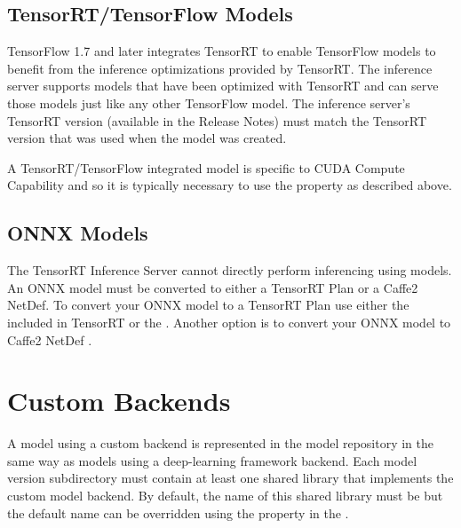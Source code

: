 \documentclass[letterpaper,10pt,english]{sphinxmanual}
\begin{document}
\subsection{TensorRT/TensorFlow Models}
\label{\detokenize{model_repository:tensorrt-tensorflow-models}}
TensorFlow 1.7 and later integrates TensorRT to enable TensorFlow
models to benefit from the inference optimizations provided by
TensorRT. The inference server supports models that have been
optimized with TensorRT and can serve those models just like any other
TensorFlow model. The inference server’s TensorRT version (available
in the Release Notes) must match the TensorRT version that was used
when the model was created.

A TensorRT/TensorFlow integrated model is specific to CUDA Compute
Capability and so it is typically necessary to use the {\hyperref[\detokenize{model_configuration:section-model-configuration}]{}} 
property as described above.


\subsection{ONNX Models}
\label{\detokenize{model_repository:onnx-models}}
The TensorRT Inference Server cannot directly perform inferencing
using  models. An ONNX model must be
converted to either a TensorRT Plan or a Caffe2 NetDef. To convert
your ONNX model to a TensorRT Plan use either the 
included in TensorRT or the . Another option is to
convert your ONNX model to Caffe2 NetDef .


\section{Custom Backends}
\label{\detokenize{model_repository:custom-backends}}\label{\detokenize{model_repository:section-custom-backends}}
A model using a custom backend is represented in the model repository
in the same way as models using a deep-learning framework backend.
Each model version subdirectory must contain at least one shared
library that implements the custom model backend. By default, the name
of this shared library must be  but the default name
can be overridden using the  property in the
{\hyperref[\detokenize{model_configuration:section-model-configuration}]{}}.
\end{document}
